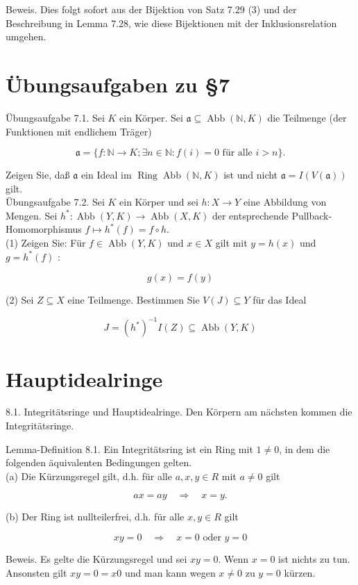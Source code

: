 \documentclass[10pt, letterpaper]{article}
\begin{document}
Beweis. Dies folgt sofort aus der Bijektion von Satz 7.29 (3) und der Beschreibung in Lemma 7.28, wie diese Bijektionen mit der Inklusionsrelation umgehen.

\section*{Übungsaufgaben zu §7}
Übungsaufgabe 7.1. Sei $K$ ein Körper. Sei $\mathfrak{a} \subseteq \operatorname{Abb}(\mathbb{N}, K)$ die Teilmenge (der Funktionen mit endlichem Träger)

$$
\mathfrak{a}=\{f: \mathbb{N} \rightarrow K ; \exists n \in \mathbb{N}: f(i)=0 \text { für alle } i>n\} .
$$

Zeigen Sie, daß $\mathfrak{a}$ ein Ideal im $\operatorname{Ring} \operatorname{Abb}(\mathbb{N}, K)$ ist und nicht $\mathfrak{a}=I(V(\mathfrak{a}))$ gilt.\\
Übungsaufgabe 7.2. Sei $K$ ein Körper und sei $h: X \rightarrow Y$ eine Abbildung von Mengen. Sei $h^{*}: \operatorname{Abb}(Y, K) \rightarrow \operatorname{Abb}(X, K)$ der entsprechende Pullback-Homomorphismus $f \mapsto h^{*}(f)=f \circ h$.\\
(1) Zeigen Sie: Für $f \in \operatorname{Abb}(Y, K)$ und $x \in X$ gilt mit $y=h(x)$ und $g=h^{*}(f)$ :

$$
g(x)=f(y)
$$

(2) Sei $Z \subseteq X$ eine Teilmenge. Bestimmen Sie $V(J) \subseteq Y$ für das Ideal

$$
J=\left(h^{*}\right)^{-1} I(Z) \subseteq \operatorname{Abb}(Y, K)
$$

\section*{Hauptidealringe}
8.1. Integritätsringe und Hauptidealringe. Den Körpern am nächsten kommen die Integritätsringe.

Lemma-Definition 8.1. Ein Integritätsring ist ein Ring mit $1 \neq 0$, in dem die folgenden äquivalenten Bedingungen gelten.\\
(a) Die Kürzungsregel gilt, d.h. für alle $a, x, y \in R$ mit $a \neq 0$ gilt

$$
a x=a y \quad \Longrightarrow \quad x=y .
$$

(b) Der Ring ist nullteilerfrei, d.h. für alle $x, y \in R$ gilt

$$
x y=0 \quad \Longrightarrow \quad x=0 \text { oder } y=0
$$

Beweis. Es gelte die Kürzungsregel und sei $x y=0$. Wenn $x=0$ ist nichts zu tun. Ansonsten gilt $x y=0=x 0$ und man kann wegen $x \neq 0$ zu $y=0$ kürzen.
\end{document}
